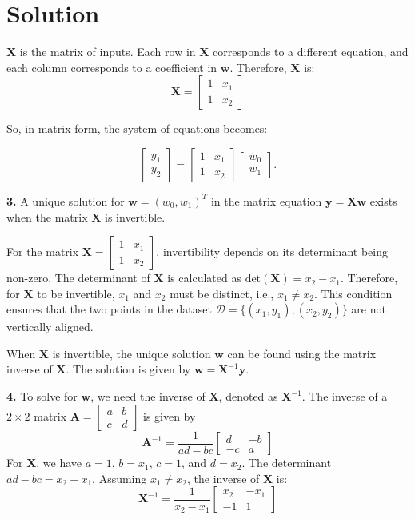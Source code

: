 \documentclass{harvardml}
\theoremstyle{definition}
\theoremstyle{plain}
\newenvironment{solution}
  {\color{blue}\section*{Solution}}
{}
\begin{document}
\begin{solution}
\(\mathbf{X}\) is the matrix of inputs. Each row in \(\mathbf{X}\) corresponds to a different equation, and each column corresponds to a coefficient in \(\mathbf{w}\). Therefore, \(\mathbf{X}\) is:
\[\mathbf{X} = \begin{bmatrix} 1 & x_1 \\ 1 & x_2 \end{bmatrix}\]

So, in matrix form, the system of equations becomes:

\[\begin{bmatrix} y_1 \\ y_2 \end{bmatrix} = \begin{bmatrix} 1 & x_1 \\ 1 & x_2 \end{bmatrix} \begin{bmatrix} w_0 \\ w_1 \end{bmatrix}.\]

\bigskip
\noindent \textbf{3.}
A unique solution for \(\mathbf{w} = (w_0, w_1)^T\) in the matrix equation \(\mathbf{y} = \mathbf{Xw}\) exists when the matrix \(\mathbf{X}\) is invertible. 

For the matrix \(\mathbf{X} = \begin{bmatrix} 1 & x_1 \\ 1 & x_2 \end{bmatrix}\), invertibility depends on its determinant being non-zero. The determinant of \(\mathbf{X}\) is calculated as \(\text{det}(\mathbf{X}) = x_2 - x_1\). Therefore, for \(\mathbf{X}\) to be invertible, \(x_1\) and \(x_2\) must be distinct, i.e., \(x_1 \neq x_2\). This condition ensures that the two points in the dataset \(\mathcal{D} = \{(x_1, y_1), (x_2, y_2)\}\) are not vertically aligned.

\medskip
When \(\mathbf{X}\) is invertible, the unique solution \(\mathbf{w}\) can be found using the matrix inverse of \(\mathbf{X}\). The solution is given by \(\mathbf{w} = \mathbf{X}^{-1}\mathbf{y}\).

\bigskip
\noindent \textbf{4.}
To solve for \(\mathbf{w}\), we need the inverse of \(\mathbf{X}\), denoted as \(\mathbf{X}^{-1}\). The inverse of a \(2 \times 2\) matrix \(\mathbf{A} = \begin{bmatrix} a & b \\ c & d \end{bmatrix}\) is given by 
   \[ \mathbf{A}^{-1} = \frac{1}{ad - bc} \begin{bmatrix} d & -b \\ -c & a \end{bmatrix} \]
   For \(\mathbf{X}\), we have \(a = 1\), \(b = x_1\), \(c = 1\), and \(d = x_2\). The determinant \(ad - bc = x_2 - x_1\). Assuming \(x_1 \neq x_2\), the inverse of \(\mathbf{X}\) is:
   \[ \mathbf{X}^{-1} = \frac{1}{x_2 - x_1} \begin{bmatrix} x_2 & -x_1 \\ -1 & 1 \end{bmatrix} \]


\end{solution}
\end{document}
